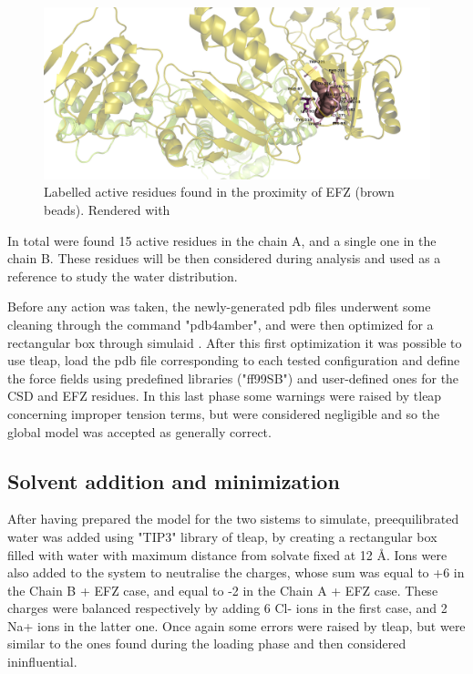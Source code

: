 \documentclass[12pt]{article}
\begin{document}
\begin{figure}
    \centering
    \includegraphics[width=\textwidth]{../figures/act_res.png}
    \caption{Labelled active residues found in the proximity of EFZ (brown beads). Rendered with \cite[Pymol]{pymol} \label{fig:actres}}
\end{figure}
In total were found 15 active residues in the chain A, and a single one in the chain B. These residues will be then considered during
analysis and used as a reference to study the water distribution.

Before any action was taken, the newly-generated pdb files underwent some cleaning through the command "pdb4amber", and were then optimized for a rectangular box through simulaid \cite{simulaid}. After this first optimization it was possible to use tleap, load the pdb file corresponding to each tested configuration and define the force fields using predefined libraries ("ff99SB") and user-defined ones for the CSD and EFZ residues. In this last phase some warnings were raised by tleap concerning improper tension terms, but were considered negligible and so the global model was accepted as generally correct.

\subsection{Solvent addition and minimization}
After having prepared the model for the two sistems to simulate, preequilibrated water was added using "TIP3" library of tleap, by creating a rectangular box filled with water with maximum distance from solvate fixed at 12 \AA. Ions were also added to the system to neutralise the charges, whose sum was equal to +6 in the Chain B + EFZ case, and equal to -2 in the Chain A + EFZ case.
These charges were balanced respectively by adding 6 Cl- ions in the first case, and 2 Na+ ions in the latter one. Once again some errors were raised by tleap, but were similar to the ones found during the loading phase and then considered ininfluential.
\end{document}
